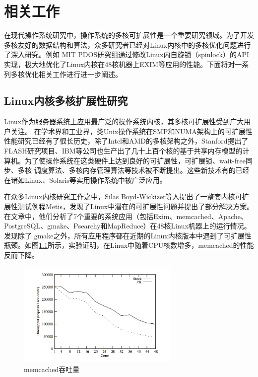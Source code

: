 

\chapter{相关工作}
\label{cha:relwork}

在现代操作系统研究中，操作系统的多核可扩展性是一个重要研究领域。为了开发多核友好的数据结构和算法，众多研究者已经对Linux内核中的多核优化问题进行了深入研究。例如
MIT PDOS研究组通过修改Linux内自旋锁（spinlock）的API实现\cite{locks:linuxsymp}，极大地优化了Linux内核在48核机器上EXIM等应用的性能。下面将对一系列多核优化相关工作进行进一步阐述。

\section{Linux内核多核扩展性研究}
Linux作为服务器系统上应用最广泛的操作系统内核，其多核可扩展性受到广大用户关注。
在学术界和工业界，类Unix操作系统在SMP和NUMA架构上的可扩展性性能研究已经有了很长历史，除了Intel和AMD的多核架构之外，Stanford提出了FLASH研究项目\cite{kuskin1994stanford}、IBM等公司也生产出了几十上百个核的基于共享内存模型的计算机。为了使操作系统在这类硬件上达到良好的可扩展性，可扩展锁、wait-free同步、多核
调度算法、多核内存管理算法等技术被不断提出。这些新技术有的已经在诸如Linux、Solaris等实用操作系统中被广泛应用。

在众多Linux内核研究工作之中，Silas Boyd-Wickizer等人提出了一整套内核可扩展性测试例程Metis\cite{linux:osdi10}，发现了Linux中潜在的可扩展性问题并提出了部分解决方案。
在文章中，他们分析了7个重要的系统应用（包括Exim、memcached、Apache、PostgreSQL、gmake、Psearchy和MapReduce）在48核Linux机器上的运行情况。发现除了
gmake之外，所有应用程序都在近期的Linux内核版本中遇到了可扩展性瓶颈。如图\ref{fig:memcached}所示，实验证明，在Linux中随着CPU核数增多，memcached的性能反而下降。

\begin{figure}[ht]
\begin{center}
\includegraphics[width=0.7\textwidth]{figures/memcached_test.png}
\end{center}
\caption{memcached吞吐量\cite{linux:osdi10}}
\label{fig:memcached}
\end{figure}

